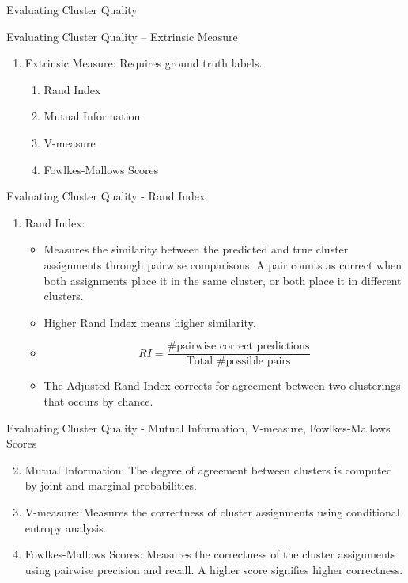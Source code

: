 \documentclass[aspectratio=169,xcolor=dvipsnames,svgnames,x11names,fleqn]{beamer}
\begin{document}
\begin{sectionframe}{\faBroom}{Evaluating Cluster Quality}
\end{sectionframe}


\begin{frame}{Evaluating Cluster Quality -- Extrinsic Measure}
    \begin{enumerate}
    \item Extrinsic Measure: Requires ground truth labels.
    \begin{enumerate}
        \item Rand Index
        \item Mutual Information
        \item V-measure
        \item Fowlkes-Mallows Scores
    \end{enumerate}
\end{enumerate}
\end{frame}

\begin{frame}{Evaluating Cluster Quality - Rand Index}
    \begin{enumerate}
    \item Rand Index:
    \begin{itemize}
       \item Measures the similarity between the predicted and true cluster assignments through pairwise comparisons. A pair counts as correct when both assignments place it in the same cluster, or both place it in different clusters.

        \item Higher Rand Index means higher similarity.
        \item \[RI = \frac{\text{\# pairwise correct predictions}}{\text{Total \# possible pairs}}\]
       \item The Adjusted Rand Index corrects for agreement between two clusterings that occurs by chance.
    \end{itemize}
\end{enumerate}
\end{frame}

\begin{frame}{Evaluating Cluster Quality - Mutual Information, V-measure, Fowlkes-Mallows Scores}
\begin{enumerate}
    \setcounter{enumi}{1}
    \item Mutual Information: The degree of agreement between clusters is computed by joint and marginal probabilities.
    \item V-measure: Measures the correctness of cluster assignments using conditional entropy analysis.
    \item Fowlkes-Mallows Scores: Measures the correctness of the cluster assignments using pairwise precision and recall. A higher score signifies higher correctness.
\end{enumerate}
\end{frame}
\end{document}

